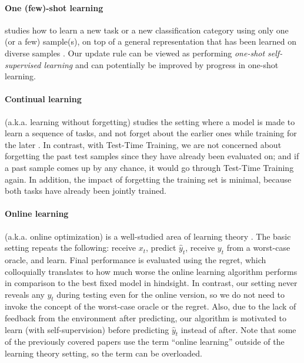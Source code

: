 \documentclass{article}
\theoremstyle{plain}
\theoremstyle{remark}
\theoremstyle{definition}
\begin{document}
\paragraph{One (few)-shot learning} studies how to learn a new task or a new classification category using only one (or a few) sample(s), on top of a general representation that has been learned on diverse samples 
\citep{snell2017prototypical, vinyals2016matching, fei2006one, ravi2016optimization, li2017meta, finn2017model, gidaris2018dynamic}.
Our update rule can be viewed as performing \emph{one-shot self-supervised learning} and can potentially be improved by progress in one-shot learning.

\paragraph{Continual learning} (a.k.a. learning without forgetting) studies the setting where a model is made to learn a sequence of tasks, and not forget about the earlier ones while training for the later \citep{li2017learning, lopez2017gradient, kirkpatrick2017overcoming, santoro2016meta}. In contrast, with Test-Time Training, we are not concerned about forgetting the past test samples since they have already been evaluated on; and if a past sample comes up by any chance, it would go through Test-Time Training again. In addition, the impact of forgetting the training set is minimal, because both tasks have already been jointly trained.

\paragraph{Online learning} (a.k.a. online optimization) is a well-studied area of learning theory
\citep{shalev2012online, hazan2016introduction}. 
The basic setting repeats the following: receive $x_t$, predict $\hat{y}_t$, receive $y_t$ from a worst-case oracle, and learn.
Final performance is evaluated using the regret, which colloquially translates to how much worse the online learning algorithm performs in comparison to the best fixed model in hindsight.
In contrast, our setting never reveals any $y_t$ during testing even for the online version, so we do not need to invoke the concept of the worst-case oracle or the regret.
Also, due to the lack of feedback from the environment after predicting, our algorithm is motivated to learn (with self-supervision) before predicting $\hat{y}_t$ instead of after.
Note that some of the previously covered papers \cite{hoffman2014continuous, jain2011online, mullapudi2018online} use the term ``online learning'' outside of the learning theory setting, so the term can be overloaded.
\end{document}

